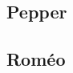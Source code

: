 \subsection{Pepper}
\label{Entreprise: Les produits: Pepper}

\subsection{Roméo}
\label{Entreprise: Les produits: Roméo}

